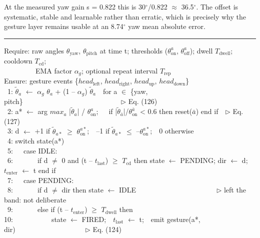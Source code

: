 At the measured yaw gain s = 0.822 this is 30$^{\circ}$/0.822 $\approx$ 36.5$^{\circ}$. The offset is systematic, stable and learnable rather than erratic, which is precisely why the gesture layer remains usable at an 8.74$^{\circ}$ yaw mean absolute error.

\begin{algorithm}[htbp]
\caption{Deliberate head-gesture finite-state machine (per axis, with arbitration)}
\label{alg:6}
\hrule\vspace{3pt}
{\ttfamily\scriptsize\raggedright
Require: raw angles $\theta_{\mathrm{yaw}}$, $\theta_{\mathrm{pitch}}$ at time t; thresholds ($\theta_{\mathrm{on}}^{a}$, $\theta_{\mathrm{off}}^{a}$); dwell $T_{\mathrm{dwell}}$; cooldown $T_{\mathrm{cd}}$; \\
~~~~~~~~~EMA factor $\alpha_{g}$; optional repeat interval $T_{\mathrm{rep}}$ \\
Ensure: gesture events \{$head_{\mathrm{left}}$, $head_{\mathrm{right}}$, $head_{\mathrm{up}}$, $head_{\mathrm{down}}$\} \\
~1: $\tilde{\theta }_{a}$ $\leftarrow$ $\alpha_{g}$ $\theta_{a}$ + (1 -- $\alpha_{g}$) $\tilde{\theta }_{a}$~~for a $\in$ \{yaw, pitch\}~~~~~~~~~~~~~~~~~~~~~~~~~~~~$\triangleright$ Eq. (126) \\
~2: a* $\leftarrow$ arg $max_{a}$ |$\tilde{\theta }_{a}$| / $\theta_{\mathrm{on}}^{a}$;~~~if |$\tilde{\theta }_{\bar{a}}$|/$\theta_{\mathrm{on}}^{\bar{a}}$ < 0.6 then reset($\bar{a}$) end if~~$\triangleright$ Eq. (127) \\
~3: d $\leftarrow$ +1 if $\tilde{\theta }_{a*}$ $\geq$ $\theta_{\mathrm{on}}^{a*}$;~~--1 if $\tilde{\theta }_{a*}$ $\leq$ --$\theta_{\mathrm{on}}^{a*}$;~~0 otherwise \\
~4: switch state(a*) \\
~5:~~~case IDLE: \\
~6:~~~~~~~if d $\neq$ 0 and (t -- $t_{\mathrm{last}}$) $\geq$ $T_{\mathrm{cd}}$ then state $\leftarrow$ PENDING; dir $\leftarrow$ d; $t_{\mathrm{enter}}$ $\leftarrow$ t end if \\
~7:~~~case PENDING: \\
~8:~~~~~~~if d $\neq$ dir then state $\leftarrow$ IDLE~~~~~~~~~~~~~~~~~~~~~~~$\triangleright$ left the band: not deliberate \\
~9:~~~~~~~else if (t -- $t_{\mathrm{enter}}$) $\geq$ $T_{\mathrm{dwell}}$ then \\
10:~~~~~~~~~~~state $\leftarrow$ FIRED;~~$t_{\mathrm{last}}$ $\leftarrow$ t;~~emit gesture(a*, dir)~~~~~~~~~~~~~~~~~~~~$\triangleright$ Eq. (124) \\
}
\end{algorithm}
